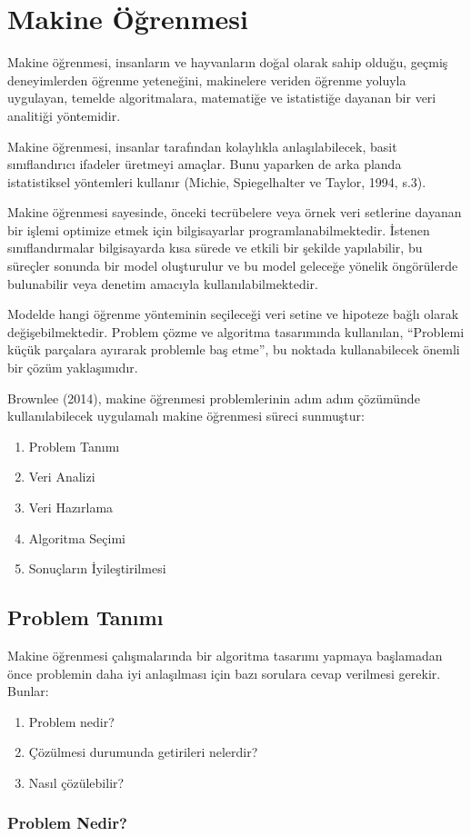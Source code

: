 \documentclass[12pt,twoside]{deuthesis}
\providecommand{\tightlist}{%
  \setlength{\itemsep}{0pt}\setlength{\parskip}{0pt}}
\begin{document}
\hypertarget{makine-uxf6ux11frenmesi}{%
\chapter{Makine Öğrenmesi}\label{makine-uxf6ux11frenmesi}}

Makine öğrenmesi, insanların ve hayvanların doğal olarak sahip olduğu, geçmiş deneyimlerden öğrenme yeteneğini, makinelere veriden öğrenme yoluyla uygulayan, temelde algoritmalara, matematiğe ve istatistiğe dayanan bir veri analitiği yöntemidir.

Makine öğrenmesi, insanlar tarafından kolaylıkla anlaşılabilecek, basit sınıflandırıcı ifadeler üretmeyi amaçlar. Bunu yaparken de arka planda istatistiksel yöntemleri kullanır (Michie, Spiegelhalter ve Taylor, 1994, s.3).

Makine öğrenmesi sayesinde, önceki tecrübelere veya örnek veri setlerine dayanan bir işlemi optimize etmek için bilgisayarlar programlanabilmektedir. İstenen sınıflandırmalar bilgisayarda kısa sürede ve etkili bir şekilde yapılabilir, bu süreçler sonunda bir model oluşturulur ve bu model geleceğe yönelik öngörülerde bulunabilir veya denetim amacıyla kullanılabilmektedir.

Modelde hangi öğrenme yönteminin seçileceği veri setine ve hipoteze bağlı olarak değişebilmektedir. Problem çözme ve algoritma tasarımında kullanılan, ``Problemi küçük parçalara ayırarak problemle baş etme'', bu noktada kullanabilecek önemli bir çözüm yaklaşımıdır.

Brownlee (2014), makine öğrenmesi problemlerinin adım adım çözümünde kullanılabilecek uygulamalı makine öğrenmesi süreci sunmuştur:
\begin{enumerate}
\def\labelenumi{\arabic{enumi}.}
\tightlist
\item
  Problem Tanımı
\item
  Veri Analizi
\item
  Veri Hazırlama
\item
  Algoritma Seçimi
\item
  Sonuçların İyileştirilmesi
\end{enumerate}
\hypertarget{problem-tanux131mux131}{%
\section{Problem Tanımı}\label{problem-tanux131mux131}}

Makine öğrenmesi çalışmalarında bir algoritma tasarımı yapmaya başlamadan önce problemin daha iyi anlaşılması için bazı sorulara cevap verilmesi gerekir. Bunlar:
\begin{enumerate}
\def\labelenumi{\arabic{enumi}.}
\item
  Problem nedir?
\item
  Çözülmesi durumunda getirileri nelerdir?
\item
  Nasıl çözülebilir?
\end{enumerate}
\hypertarget{problem-nedir}{%
\subsection{Problem Nedir?}\label{problem-nedir}}
\end{document}
